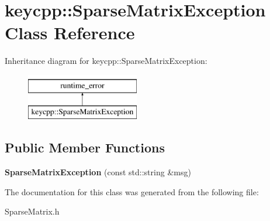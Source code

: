 \hypertarget{classkeycpp_1_1_sparse_matrix_exception}{\section{keycpp\-:\-:Sparse\-Matrix\-Exception Class Reference}
\label{classkeycpp_1_1_sparse_matrix_exception}
}
Inheritance diagram for keycpp\-:\-:Sparse\-Matrix\-Exception\-:\begin{figure}[H]
\begin{center}
\leavevmode
\includegraphics[height=2.000000cm]{classkeycpp_1_1_sparse_matrix_exception}
\end{center}
\end{figure}
\subsection*{Public Member Functions}
\begin{DoxyCompactItemize}
\item 
\hypertarget{classkeycpp_1_1_sparse_matrix_exception_a945e6dc81b78c408d0a14b9001632f7e}{{\bfseries Sparse\-Matrix\-Exception} (const std\-::string \&msg)}\label{classkeycpp_1_1_sparse_matrix_exception_a945e6dc81b78c408d0a14b9001632f7e}

\end{DoxyCompactItemize}


The documentation for this class was generated from the following file\-:\begin{DoxyCompactItemize}
\item 
Sparse\-Matrix.\-h\end{DoxyCompactItemize}
